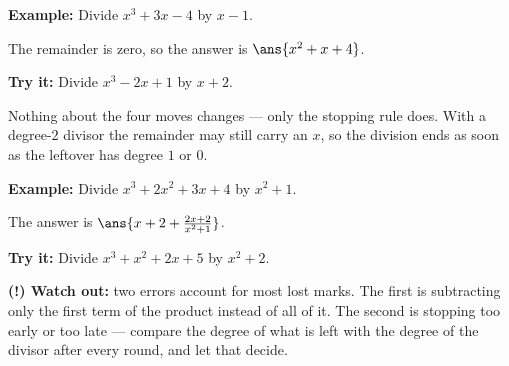 \documentclass[12pt]{article}
\begin{document}
\begin{examplebox}
\textbf{Example:} Divide $x^3 + 3x - 4$ by $x - 1$.

The remainder is zero, so the answer is $\ans{x^2 + x + 4}$.
\end{examplebox}

\begin{tryitbox}
\textbf{Try it:} Divide $x^3 - 2x + 1$ by $x + 2$.\\[2pt]
\end{tryitbox}


\begin{formulabox}
Nothing about the four moves changes --- only the stopping rule does. With a
degree-$2$ divisor the remainder may still carry an $x$, so the division ends
as soon as the leftover has degree $1$ or $0$.
\end{formulabox}

\begin{examplebox}
\textbf{Example:} Divide $x^3 + 2x^2 + 3x + 4$ by $x^2 + 1$.

The answer is $\ans{x + 2 + \frac{2x + 2}{x^2 + 1}}$.
\end{examplebox}

\begin{tryitbox}
\textbf{Try it:} Divide $x^3 + x^2 + 2x + 5$ by $x^2 + 2$.\\[2pt]
\end{tryitbox}

\begin{watchoutbox}
\textbf{(!) Watch out:} two errors account for most lost marks. The first is
subtracting only the first term of the product instead of all of it. The
second is stopping too early or too late --- compare the degree of what is
left with the degree of the divisor after every round, and let that decide.
\end{watchoutbox}
\end{document}
